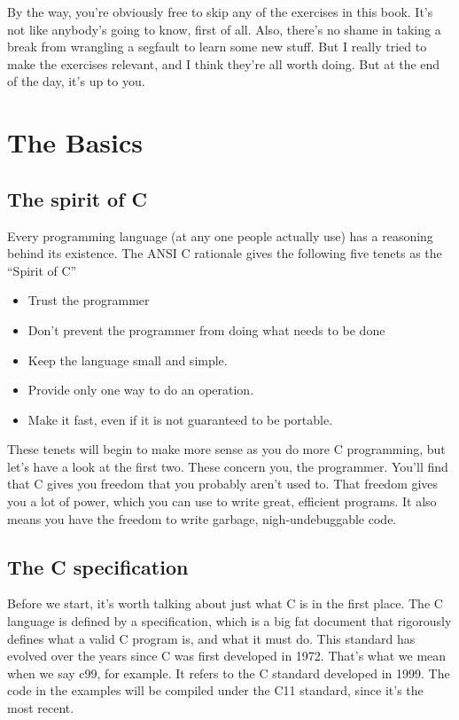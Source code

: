 \documentclass[ebook,11pt,oneside,openany]{memoir}
\begin{document}
By the way, you're obviously free to skip any of the exercises in this book. It's not like anybody's going to know, first of all. Also, there's no shame in taking a break from wrangling a segfault to learn some new stuff. But I really tried to make the exercises relevant, and I think they're all worth doing. But at the end of the day, it's up to you.

\chapter{The Basics}
\label{ch:basic}

\section{The spirit of C}
Every programming language (at any one people actually use) has a reasoning behind its existence. The ANSI C rationale gives the following five tenets as the ``Spirit of C''

\begin{itemize}
\item Trust the programmer
\item Don't prevent the programmer from doing what needs to be done
\item Keep the language small and simple.
\item Provide only one way to do an operation.
\item Make it fast, even if it is not guaranteed to be portable.
\end{itemize}

These tenets will begin to make more sense as you do more C programming, but let's have a look at the first two. These concern you, the programmer. You'll find that C gives you freedom that you probably aren't used to. That freedom gives you a lot of power, which you can use to write great, efficient programs. It also means you have the freedom to write garbage, nigh-undebuggable code.

\section{The C specification}

Before we start, it's worth talking about just what C is in the first place. The C language is defined by a specification, which is a big fat document that rigorously defines what a valid C program is, and what it must do. This standard has evolved over the years since C was first developed in 1972. That's what we mean when we say c99, for example. It refers to the C standard developed in 1999. The code in the examples will be compiled under the C11 standard, since it's the most recent.
\end{document}
